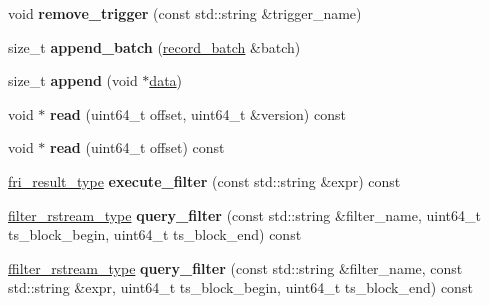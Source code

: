 \begin{DoxyCompactItemize}
void {\bfseries remove\+\_\+trigger} (const std\+::string \&trigger\+\_\+name)
\item 
\mbox{\label{classdialog_1_1dialog__table_a872c2666f9746c8eeb0263ff36e170da}} 
size\+\_\+t {\bfseries append\+\_\+batch} (\hyperlink{structdialog_1_1record__batch}{record\+\_\+batch} \&batch)
\item 
\mbox{\label{classdialog_1_1dialog__table_a497a0716dcdfa0b60498c9cd1a2da7e4}} 
size\+\_\+t {\bfseries append} (void $\ast$\hyperlink{structdialog_1_1data}{data})
\item 
\mbox{\label{classdialog_1_1dialog__table_a0e0a957cd04c7d0dc853eeab81ca8e04}} 
void $\ast$ {\bfseries read} (uint64\+\_\+t offset, uint64\+\_\+t \&version) const
\item 
\mbox{\label{classdialog_1_1dialog__table_af30bebda20f4a64e5df6de00c4d6ef0e}} 
void $\ast$ {\bfseries read} (uint64\+\_\+t offset) const
\item 
\mbox{\label{classdialog_1_1dialog__table_a96bd863f607a9227dee524fd687e021e}} 
\hyperlink{classdialog_1_1union__record__stream}{fri\+\_\+result\+\_\+type} {\bfseries execute\+\_\+filter} (const std\+::string \&expr) const
\item 
\mbox{\label{classdialog_1_1dialog__table_a5b35dba9823ea6e39ca92d2bbb54a9e1}} 
\hyperlink{classdialog_1_1record__stream}{filter\+\_\+rstream\+\_\+type} {\bfseries query\+\_\+filter} (const std\+::string \&filter\+\_\+name, uint64\+\_\+t ts\+\_\+block\+\_\+begin, uint64\+\_\+t ts\+\_\+block\+\_\+end) const
\item 
\mbox{\label{classdialog_1_1dialog__table_af168cbb5be54048fa5bc1be116ce5a1f}} 
\hyperlink{classdialog_1_1filtered__record__stream}{ffilter\+\_\+rstream\+\_\+type} {\bfseries query\+\_\+filter} (const std\+::string \&filter\+\_\+name, const std\+::string \&expr, uint64\+\_\+t ts\+\_\+block\+\_\+begin, uint64\+\_\+t ts\+\_\+block\+\_\+end) const
\item 
\mbox{\label{classdialog_1_1dialog__table_a096494c01c850fee7d9dac56bf96199b}} 

\end{DoxyCompactItemize}
